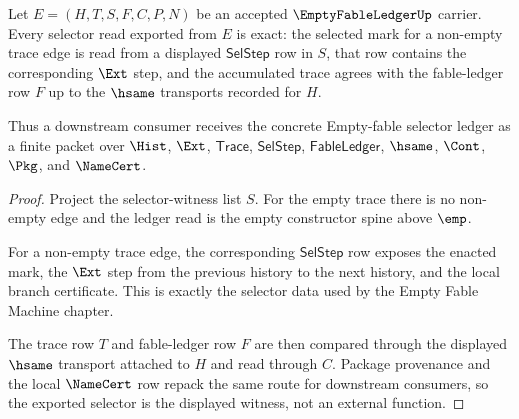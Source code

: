 \begin{theorem}
\label{thm:empty-fable-ledger-selector-exactness}
Let $E=(H,T,S,F,C,P,N)$ be an accepted $\EmptyFableLedgerUp$ carrier. Every selector read exported from $E$ is exact: the selected mark for a non-empty trace edge is read from a displayed $\mathsf{SelStep}$ row in $S$, that row contains the corresponding $\Ext$ step, and the accumulated trace agrees with the fable-ledger row $F$ up to the $\hsame$ transports recorded for $H$.

Thus a downstream consumer receives the concrete Empty-fable selector ledger as a finite packet over $\Hist$, $\Ext$, $\mathsf{Trace}$, $\mathsf{SelStep}$, $\mathsf{FableLedger}$, $\hsame$, $\Cont$, $\Pkg$, and $\NameCert$.
\end{theorem}
\begin{proof}
Project the selector-witness list $S$. For the empty trace there is no non-empty edge and the ledger read is the empty constructor spine above $\emp$.

For a non-empty trace edge, the corresponding $\mathsf{SelStep}$ row exposes the enacted mark, the $\Ext$ step from the previous history to the next history, and the local branch certificate. This is exactly the selector data used by the Empty Fable Machine chapter.

The trace row $T$ and fable-ledger row $F$ are then compared through the displayed $\hsame$ transport attached to $H$ and read through $C$. Package provenance and the local $\NameCert$ row repack the same route for downstream consumers, so the exported selector is the displayed witness, not an external function.
\end{proof}

